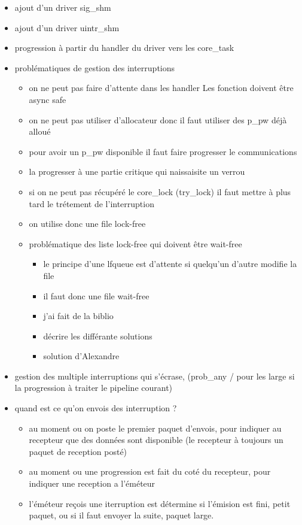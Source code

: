\begin{itemize}
  \item ajout d'un driver sig_shm
  \item ajout d'un driver uintr_shm
  \item progression à partir du handler du driver vers les core_task
  \item problématiques de gestion des interruptions
  \begin{itemize}
    \item on ne peut pas faire d'attente dans les handler
    Les fonction doivent être async safe
    \item on ne peut pas utiliser d'allocateur donc il faut utiliser des p_pw déjà alloué
    \item pour avoir un p_pw disponible il faut faire progresser le communications
    \item la progresser à une partie critique qui naissaisite un verrou
    \item si on ne peut pas récupéré le core_lock (try_lock) il faut mettre à plus tard le trétement de l'interruption
    \item on utilise donc une file lock-free
    \item problématique des liste lock-free qui doivent être wait-free
    \begin{itemize}
      \item le principe d'une lfqueue est d'attente si quelqu'un d'autre modifie la file
      \item il faut donc une file wait-free
      \item j'ai fait de la biblio
      \item décrire les différante solutions
      \item solution d'Alexandre
    \end{itemize}
  \end{itemize}
  \item gestion des multiple interruptions qui s'écrase, (prob_any / pour les large si la progression à traiter le pipeline courant)
  \item quand est ce qu'on envois des interruption ?
  \begin{itemize}
    \item au moment ou on poste le premier paquet d'envois, pour indiquer au recepteur que des données sont disponible (le recepteur à toujours un paquet de reception posté)
    \item au moment ou une progression est fait du coté du recepteur, pour indiquer une reception a l'éméteur
    \item l'éméteur reçois une iterruption est détermine si l'émision est fini, petit paquet, ou si il faut envoyer la suite, paquet large.
  \end{itemize}
\end{itemize}

